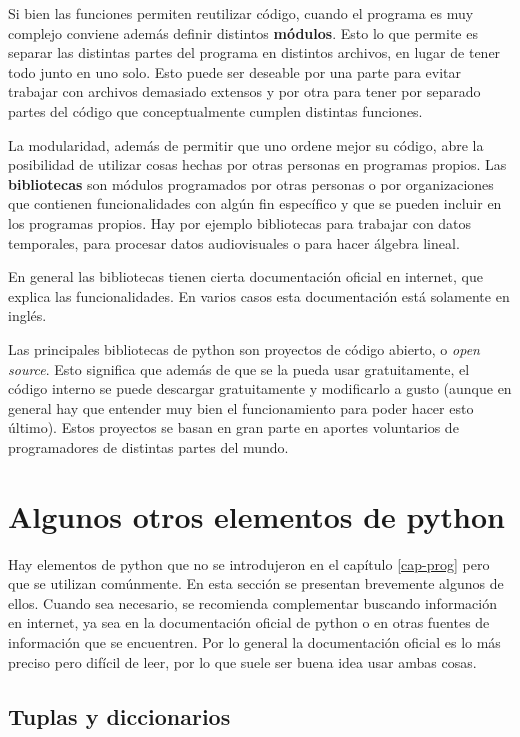 \documentclass[a4paper, 12pt]{report}
\theoremstyle{definition}
\begin{document}
Si bien las funciones permiten reutilizar código, cuando el programa es muy complejo conviene además definir distintos {\bf módulos}. Esto lo que permite es separar las distintas partes del programa en distintos archivos, en lugar de tener todo junto en uno solo. Esto puede ser deseable por una parte para evitar trabajar con archivos demasiado extensos y por otra para tener por separado partes del código que conceptualmente cumplen distintas funciones.

La modularidad, además de permitir que uno ordene mejor su código, abre la posibilidad de utilizar cosas hechas por otras personas en programas propios. Las {\bf bibliotecas} son módulos programados por otras personas o por organizaciones que contienen funcionalidades con algún fin específico y que se pueden incluir en los programas propios. Hay por ejemplo bibliotecas para trabajar con datos temporales, para procesar datos audiovisuales o para hacer álgebra lineal.

En general las bibliotecas tienen cierta documentación oficial en internet, que explica las funcionalidades. En varios casos esta documentación está solamente en inglés.

Las principales bibliotecas de python son proyectos de código abierto, o {\sl open source}. Esto significa que además de que se la pueda usar gratuitamente, el código interno se puede descargar gratuitamente y modificarlo a gusto (aunque en general hay que entender muy bien el funcionamiento para poder hacer esto último). Estos proyectos se basan en gran parte en aportes voluntarios de programadores de distintas partes del mundo.

\section{Algunos otros elementos de python}

Hay elementos de python que no se introdujeron en el capítulo \ref{cap-prog} pero que se utilizan comúnmente. En esta sección se presentan brevemente algunos de ellos. Cuando sea necesario, se recomienda complementar buscando información en internet, ya sea en la documentación oficial de python o en otras fuentes de información que se encuentren. Por lo general la documentación oficial es lo más preciso pero difícil de leer, por lo que suele ser buena idea usar ambas cosas.

\subsection{Tuplas y diccionarios}
\end{document}
